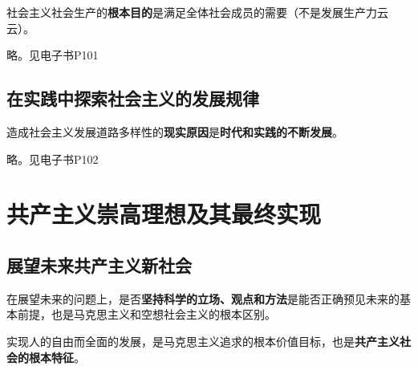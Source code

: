 \documentclass[12pt, a4paper, oneside]{ctexart}
\begin{document}
社会主义社会生产的\textbf{根本目的}是满足全体社会成员的需要（不是发展生产力云云）。

略。见电子书P101

\subsection{在实践中探索社会主义的发展规律}

造成社会主义发展道路多样性的\textbf{现实原因}是\textbf{时代和实践的不断发展}。

略。见电子书P102

\section{共产主义崇高理想及其最终实现}

\subsection{展望未来共产主义新社会}

在展望未来的问题上，是否\textbf{坚持科学的立场、观点和方法}是能否正确预见未来的基本前提，也是马克思主义和空想社会主义的根本区别。

实现人的自由而全面的发展，是马克思主义追求的根本价值目标，也是\textbf{共产主义社会的根本特征}。
\end{document}

